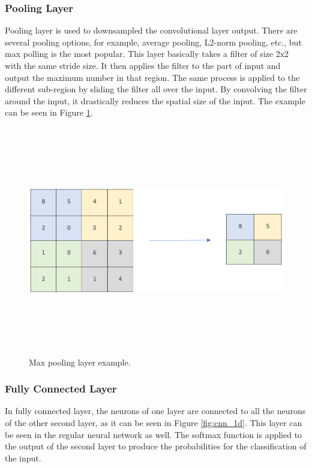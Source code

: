 \subsubsection{Pooling Layer}
Pooling layer is used to downsampled the convolutional layer output. There are several pooling options, for example, average pooling, L2-norm pooling, etc., but max polling is the most popular. This layer basically takes a filter of size 2x2 with the same stride size. It then applies the filter to the part of input and output the maximum number in that region. The same process is applied to the different sub-region by sliding the filter all over the input. By convolving the filter around the input, it drastically reduces the spatial size of the input. The example can be seen in Figure \ref{fig:maxpool}.

\begin{figure}[htpb]
	\centering
	\includegraphics[width=12cm,height=10cm,keepaspectratio=true]{images/maxpool}
	\caption{
		Max pooling layer example.
	}
	\label{fig:maxpool}
\end{figure}

\subsubsection{Fully Connected Layer}
In fully connected layer, the neurons of one layer are connected to all the neurons of the other second layer, as it can be seen in Figure \ref{fig:cnn_1d}. This layer can be seen in the regular neural network as well. The softmax function is applied to the output of the second layer to produce the probabilities for the classification of the input. 

